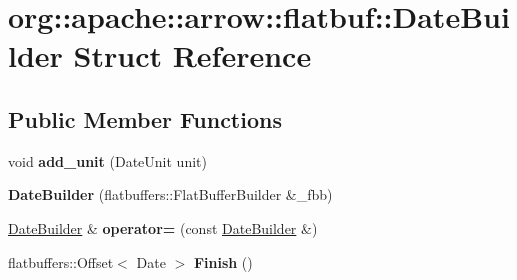 \hypertarget{structorg_1_1apache_1_1arrow_1_1flatbuf_1_1DateBuilder}{}\section{org\+:\+:apache\+:\+:arrow\+:\+:flatbuf\+:\+:Date\+Builder Struct Reference}
\label{structorg_1_1apache_1_1arrow_1_1flatbuf_1_1DateBuilder}
\subsection*{Public Member Functions}
\begin{DoxyCompactItemize}
\item 
void {\bfseries add\+\_\+unit} (Date\+Unit unit)\hypertarget{structorg_1_1apache_1_1arrow_1_1flatbuf_1_1DateBuilder_a02d64173ad6e5694cf8324e38088a77b}{}\label{structorg_1_1apache_1_1arrow_1_1flatbuf_1_1DateBuilder_a02d64173ad6e5694cf8324e38088a77b}

\item 
{\bfseries Date\+Builder} (flatbuffers\+::\+Flat\+Buffer\+Builder \&\+\_\+fbb)\hypertarget{structorg_1_1apache_1_1arrow_1_1flatbuf_1_1DateBuilder_a68c1d9c5c466500501ad82ddf0c31449}{}\label{structorg_1_1apache_1_1arrow_1_1flatbuf_1_1DateBuilder_a68c1d9c5c466500501ad82ddf0c31449}

\item 
\hyperlink{structorg_1_1apache_1_1arrow_1_1flatbuf_1_1DateBuilder}{Date\+Builder} \& {\bfseries operator=} (const \hyperlink{structorg_1_1apache_1_1arrow_1_1flatbuf_1_1DateBuilder}{Date\+Builder} \&)\hypertarget{structorg_1_1apache_1_1arrow_1_1flatbuf_1_1DateBuilder_a49812316f5da97763cbc8b705d9f24f0}{}\label{structorg_1_1apache_1_1arrow_1_1flatbuf_1_1DateBuilder_a49812316f5da97763cbc8b705d9f24f0}

\item 
flatbuffers\+::\+Offset$<$ Date $>$ {\bfseries Finish} ()\hypertarget{structorg_1_1apache_1_1arrow_1_1flatbuf_1_1DateBuilder_a7ba3289f5e08ca3b8de98b524be929cb}{}\label{structorg_1_1apache_1_1arrow_1_1flatbuf_1_1DateBuilder_a7ba3289f5e08ca3b8de98b524be929cb}

\end{DoxyCompactItemize}
